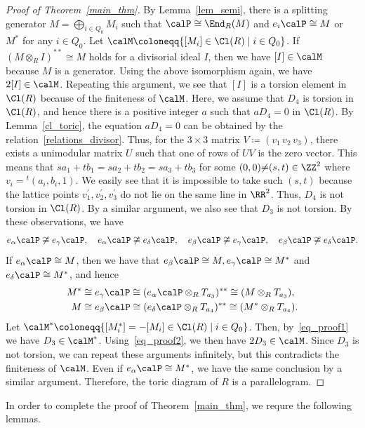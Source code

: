 \begin{proof}[Proof of Theorem~\ref{main_thm}]
By Lemma~\ref{lem_semi}, there is a splitting generator $M=\bigoplus_{i\in Q_0}M_i$ such that $\calP\cong\End_R(M)$ and $e_i\calP\cong M$ or $M^*$ for any $i\in Q_0$. Let $\calM\coloneqq\{[M_i]\in\Cl(R)\mid i\in Q_0\}$. If $(M\otimes_RI)^{**}\cong M$ holds for a divisorial ideal $I$, then we have $[I]\in\calM$ because $M$ is a generator. Using the above isomorphism again, we have $2[I]\in\calM$. Repeating this argument, we see that $[I]$ is a torsion element in $\Cl(R)$ because of the finiteness of $\calM$. Here, we assume that $D_4$ is torsion in $\Cl(R)$, and hence there is a positive integer $a$ such that $aD_4=0$ in $\Cl(R)$. By Lemma~\ref{cl_toric}, the equation $aD_4=0$ can be obtained by the relation~\eqref{relations_divisor}. Thus, for the $3\times 3$ matrix $V\coloneqq(v_1\,v_2\,v_3)$, there exists a unimodular matrix $U$ such that one of rows of $UV$ is the zero vector. This means that $sa_1+tb_1=sa_2+tb_2=sa_3+tb_3$ for some $(0,0){\neq}(s,t)\in\ZZ^2$ where $v_i={}^t(a_i,b_i,1)$. We easily see that it is impossible to take such $(s,t)$ because the lattice points $v_1^\prime,v_2^\prime,v_3^\prime$ do not lie on the same line in $\RR^2$. Thus, $D_4$ is not torsion in $\Cl(R)$. By a similar argument, we also see that $D_3$ is not torsion. By these observations, we have
\[
e_\alpha\calP\not\cong e_\gamma\calP,\quad e_\alpha\calP\not\cong e_\delta\calP,\quad e_\beta\calP\not\cong e_\gamma\calP,\quad e_\beta\calP\not\cong e_\delta\calP.
\]
If $e_\alpha\calP\cong M$, then we have that $e_\beta\calP\cong M, e_\gamma\calP\cong M^*$ and $e_\delta\calP\cong M^*$, and hence
\begin{align}\label{eq_proof1}
M^*&\cong e_\gamma\calP\cong(e_\alpha\calP\otimes_RT_{a_3})^{**}\cong(M\otimes_RT_{a_3}),
\\
\label{eq_proof2}
M&\cong e_\beta\calP\cong(e_\delta\calP\otimes_RT_{a_4})^{**}\cong(M^*\otimes_RT_{a_4}).
\end{align}
Let $\calM^*\coloneqq\{[M_i^*]=-[M_i]\in\Cl(R)\mid i\in Q_0\}$. Then, by~\eqref{eq_proof1} we have $D_3\in\calM^*$. Using~\eqref{eq_proof2}, we then have $2D_3\in\calM$. Since $D_3$ is not torsion, we can repeat these arguments infinitely, but this contradicts the finiteness of $\calM$. Even if $e_\alpha\calP\cong M^*$, we have the same conclusion by a similar argument. Therefore, the toric diagram of $R$ is a parallelogram.
\end{proof}


In order to complete the proof of Theorem~\ref{main_thm}, we requre the following lemmas.

